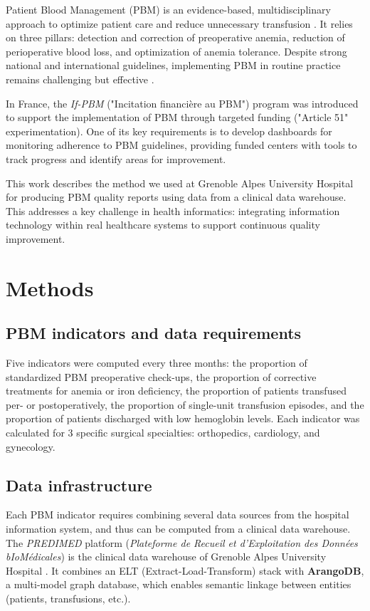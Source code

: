 \documentclass{IOS-Book-Article}
\begin{document}
Patient Blood Management (PBM) is an evidence-based, multidisciplinary approach to
optimize patient care and reduce unnecessary transfusion \cite{shander2022global}. 
It relies on three pillars: detection and correction of preoperative anemia, reduction 
of perioperative blood loss, and optimization of anemia tolerance. 
Despite strong national \cite{theissen2024perioperative} and international \cite{tibi2021sts} 
guidelines, implementing PBM in routine practice remains challenging but 
effective \cite{godonReductionRedBlood2024}.

In France, the \textit{If-PBM} ("Incitation financière au PBM") program was introduced 
to support the implementation of PBM through targeted funding ("Article 51" experimentation). 
One of its key requirements is to develop dashboards for monitoring adherence to 
PBM guidelines, providing funded centers with tools to track progress and identify areas
for improvement.

This work describes the method we used at Grenoble Alpes University Hospital for 
producing PBM quality reports using data from a clinical data warehouse. 
This addresses a key challenge in health informatics: integrating information 
technology within real healthcare systems to support continuous quality improvement.

\section{Methods}

\subsection{PBM indicators and data requirements}

Five indicators were computed every three months: the proportion of standardized PBM preoperative check-ups,
 the proportion of corrective treatments for anemia or iron deficiency, the proportion of patients 
 transfused per- or postoperatively, the proportion of single-unit transfusion episodes, and the 
 proportion of patients discharged with low hemoglobin levels. Each indicator was calculated for 3 
 specific surgical specialties: orthopedics, cardiology, and gynecology. 

\subsection{Data infrastructure}

Each PBM indicator requires combining several data sources from the hospital information system, and thus
can be computed from a clinical data warehouse.
The \textit{PREDIMED} platform (\textit{Plateforme de Recueil et d'Exploitation des Données bIoMédicales})
 is the clinical data warehouse of Grenoble Alpes University Hospital \cite{Artemova2019}. 
 It combines an ELT (Extract-Load-Transform) stack with \textbf{ArangoDB}, a multi-model graph database, 
 which enables semantic linkage between entities (patients, transfusions, etc.).
\end{document}
